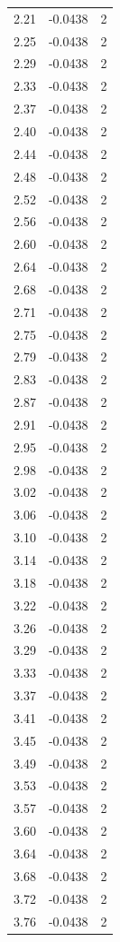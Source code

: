\begin{longtable}{lrr}
  2.21 & -0.0438 & 2 \\
  2.25 & -0.0438 & 2 \\
  2.29 & -0.0438 & 2 \\
  2.33 & -0.0438 & 2 \\
  2.37 & -0.0438 & 2 \\
  2.40 & -0.0438 & 2 \\
  2.44 & -0.0438 & 2 \\
  2.48 & -0.0438 & 2 \\
  2.52 & -0.0438 & 2 \\
  2.56 & -0.0438 & 2 \\
  2.60 & -0.0438 & 2 \\
  2.64 & -0.0438 & 2 \\
  2.68 & -0.0438 & 2 \\
  2.71 & -0.0438 & 2 \\
  2.75 & -0.0438 & 2 \\
  2.79 & -0.0438 & 2 \\
  2.83 & -0.0438 & 2 \\
  2.87 & -0.0438 & 2 \\
  2.91 & -0.0438 & 2 \\
  2.95 & -0.0438 & 2 \\
  2.98 & -0.0438 & 2 \\
  3.02 & -0.0438 & 2 \\
  3.06 & -0.0438 & 2 \\
  3.10 & -0.0438 & 2 \\
  3.14 & -0.0438 & 2 \\
  3.18 & -0.0438 & 2 \\
  3.22 & -0.0438 & 2 \\
  3.26 & -0.0438 & 2 \\
  3.29 & -0.0438 & 2 \\
  3.33 & -0.0438 & 2 \\
  3.37 & -0.0438 & 2 \\
  3.41 & -0.0438 & 2 \\
  3.45 & -0.0438 & 2 \\
  3.49 & -0.0438 & 2 \\
  3.53 & -0.0438 & 2 \\
  3.57 & -0.0438 & 2 \\
  3.60 & -0.0438 & 2 \\
  3.64 & -0.0438 & 2 \\
  3.68 & -0.0438 & 2 \\
  3.72 & -0.0438 & 2 \\
  3.76 & -0.0438 & 2 \\

\end{longtable}
